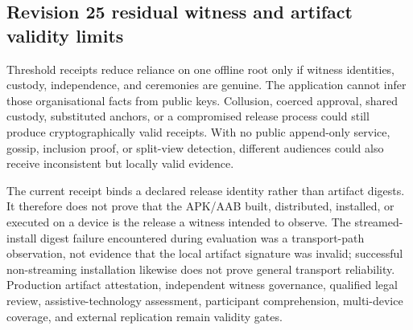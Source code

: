 

\subsection{Revision 25 residual witness and artifact validity limits}

Threshold receipts reduce reliance on one offline root only if witness identities, custody, independence, and ceremonies are genuine. The application cannot infer those organisational facts from public keys. Collusion, coerced approval, shared custody, substituted anchors, or a compromised release process could still produce cryptographically valid receipts. With no public append-only service, gossip, inclusion proof, or split-view detection, different audiences could also receive inconsistent but locally valid evidence.

The current receipt binds a declared release identity rather than artifact digests. It therefore does not prove that the APK/AAB built, distributed, installed, or executed on a device is the release a witness intended to observe. The streamed-install digest failure encountered during evaluation was a transport-path observation, not evidence that the local artifact signature was invalid; successful non-streaming installation likewise does not prove general transport reliability. Production artifact attestation, independent witness governance, qualified legal review, assistive-technology assessment, participant comprehension, multi-device coverage, and external replication remain validity gates.
